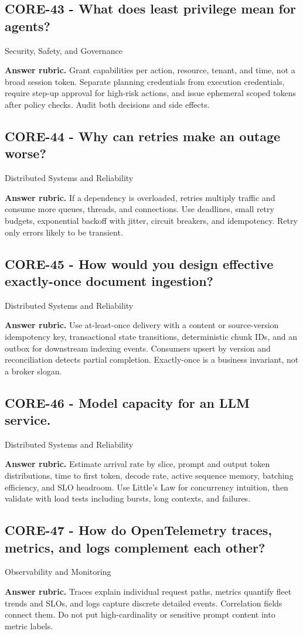 \subsection*{CORE-43 - What does least privilege mean for agents?}
 \quad Security, Safety, and Governance
\par\smallskip\textbf{Answer rubric.} Grant capabilities per action, resource, tenant, and time, not a broad session token. Separate planning credentials from execution credentials, require step-up approval for high-risk actions, and issue ephemeral scoped tokens after policy checks. Audit both decisions and side effects.
\subsection*{CORE-44 - Why can retries make an outage worse?}
 \quad Distributed Systems and Reliability
\par\smallskip\textbf{Answer rubric.} If a dependency is overloaded, retries multiply traffic and consume more queues, threads, and connections. Use deadlines, small retry budgets, exponential backoff with jitter, circuit breakers, and idempotency. Retry only errors likely to be transient.
\subsection*{CORE-45 - How would you design effective exactly-once document ingestion?}
 \quad Distributed Systems and Reliability
\par\smallskip\textbf{Answer rubric.} Use at-least-once delivery with a content or source-version idempotency key, transactional state transitions, deterministic chunk IDs, and an outbox for downstream indexing events. Consumers upsert by version and reconciliation detects partial completion. Exactly-once is a business invariant, not a broker slogan.
\subsection*{CORE-46 - Model capacity for an LLM service.}
 \quad Distributed Systems and Reliability
\par\smallskip\textbf{Answer rubric.} Estimate arrival rate by slice, prompt and output token distributions, time to first token, decode rate, active sequence memory, batching efficiency, and SLO headroom. Use Little's Law for concurrency intuition, then validate with load tests including bursts, long contexts, and failures.
\subsection*{CORE-47 - How do OpenTelemetry traces, metrics, and logs complement each other?}
 \quad Observability and Monitoring
\par\smallskip\textbf{Answer rubric.} Traces explain individual request paths, metrics quantify fleet trends and SLOs, and logs capture discrete detailed events. Correlation fields connect them. Do not put high-cardinality or sensitive prompt content into metric labels.

